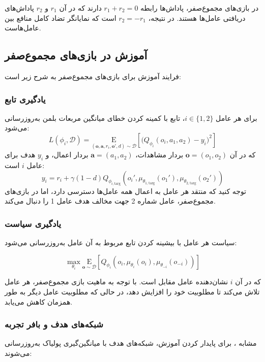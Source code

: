 در بازی‌های مجموع­‌صفر، پاداش‌ها رابطه $r_1 + r_2 = 0$ دارند که در آن $r_1$ و $r_2$ پاداش‌های دریافتی عامل‌ها هستند. در نتیجه، $r_2 = -r_1$ است که نمایانگر تضاد کامل منافع بین عامل‌هاست.

\subsection{آموزش  در بازی‌های مجموع­‌صفر}
فرایند آموزش  برای بازی‌های مجموع­‌صفر به شرح زیر است:
\subsubsection{یادگیری تابع }
برای هر عامل $i \in \{1, 2\}$، تابع  با کمینه کردن خطای میانگین مربعات بلمن به‌روزرسانی می‌شود:
\begin{equation}
    L(\phi_i, \mathcal{D}) = \underset{(\boldsymbol{o}, \boldsymbol{a}, r_i, \boldsymbol{o}', d) \sim \mathcal{D}}{\mathrm{E}}\left[ 
    \Bigg( Q_{\phi_i}(o_i, a_1, a_2) - y_i \Bigg)^2
    \right]
\end{equation}
که در آن $\boldsymbol{o} = (o_1, o_2)$ بردار مشاهدات، $\boldsymbol{a} = (a_1, a_2)$ بردار اعمال، و $y_i$ هدف برای عامل $i$ است:
\begin{equation}
    y_i = r_i + \gamma (1 - d) Q_{\phi_{i,\text{targ}}}(o_i', \mu_{\theta_{1,\text{targ}}}(o_1'), \mu_{\theta_{2,\text{targ}}}(o_2'))
\end{equation}
توجه کنید که منتقد هر عامل به اعمال همه عامل‌ها دسترسی دارد، اما در بازی‌های مجموع­‌صفر، عامل شماره 2 جهت مخالف هدف عامل 1 را دنبال می‌کند.

\subsubsection{یادگیری سیاست}

سیاست هر عامل با بیشینه کردن تابع  مربوط به آن عامل به‌روزرسانی می‌شود:

\begin{equation}
    \max_{\theta_i} \underset{\boldsymbol{o} \sim \mathcal{D}}{\mathrm{E}}\left[ Q_{\phi_i}(o_i, \mu_{\theta_i}(o_i), \mu_{\theta_{-i}}(o_{-i})) \right]
\end{equation}

که در آن $i$ نشان‌دهنده عامل مقابل است. با توجه به ماهیت بازی مجموع­‌صفر، هر عامل تلاش می‌کند تا مطلوبیت خود را افزایش دهد، در حالی که مطلوبیت عامل دیگر به طور همزمان کاهش می‌یابد.
\subsubsection{شبکه‌های هدف و بافر تجربه}
مشابه ، برای پایدار کردن آموزش، شبکه‌های هدف با میانگین‌گیری پولیاک به‌روزرسانی می‌شوند:

